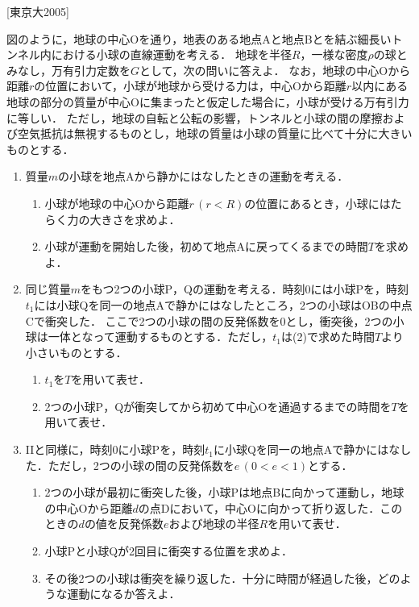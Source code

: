 

\noindent
{} [東京大2005]

図のように，地球の中心Oを通り，地表のある地点Aと地点Bとを結ぶ細長いトンネル内における小球の直線運動を考える．
地球を半径$R$，一様な密度$\rho$の球とみなし，万有引力定数を$G$として，次の問いに答えよ．
なお，地球の中心Oから距離$r$の位置において，小球が地球から受ける力は，中心Oから距離$r$以内にある地球の部分の質量が中心Oに集まったと仮定した場合に，小球が受ける万有引力に等しい．
ただし，地球の自転と公転の影響，トンネルと小球の間の摩擦および空気抵抗は無視するものとし，地球の質量は小球の質量に比べて十分に大きいものとする．

\begin{enumerate}[I]
  \item {\hzw}質量$m$の小球を地点Aから静かにはなしたときの運動を考える．
  \begin{enumerate}[(1)]
    \item {\hzw}小球が地球の中心Oから距離$r\,(r < R)$の位置にあるとき，小球にはたらく力の大きさを求めよ．
    \item {\hzw}小球が運動を開始した後，初めて地点Aに戻ってくるまでの時間$T$を求めよ．
  \end{enumerate}
  \item {\hzw}同じ質量$m$をもつ2つの小球P，Qの運動を考える．時刻0には小球Pを，時刻$t_1$には小球Qを同一の地点Aで静かにはなしたところ，2つの小球はOBの中点Cで衝突した．
  ここで2つの小球の間の反発係数を0とし，衝突後，2つの小球は一体となって運動するものとする．ただし，$t_1$は(2)で求めた時間$T$より小さいものとする．
  \begin{enumerate}[(1)]
    \item {\hzw}$t_1$を$T$を用いて表せ．
    \item {\hzw}2つの小球P，Qが衝突してから初めて中心Oを通過するまでの時間を$T$を用いて表せ．
  \end{enumerate}
  \item {\hzw}IIと同様に，時刻0に小球Pを，時刻$t_1$に小球Qを同一の地点Aで静かにはなした．ただし，2つの小球の間の反発係数を$e\, (0 < e < 1)$とする．
  \begin{enumerate}[(1)]
    \item {\hzw}2つの小球が最初に衝突した後，小球Pは地点Bに向かって運動し，地球の中心Oから距離$d$の点Dにおいて，中心Oに向かって折り返した．このときの$d$の値を反発係数$e$および地球の半径$R$を用いて表せ．
    \item {\hzw}小球Pと小球Qが2回目に衝突する位置を求めよ．
    \item {\hzw}その後2つの小球は衝突を繰り返した．十分に時間が経過した後，どのような運動になるか答えよ．
  \end{enumerate}
\end{enumerate}

